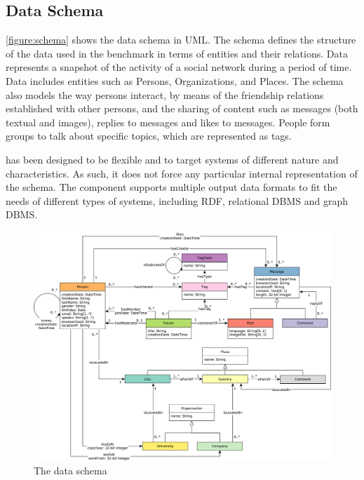 \subsection{Data Schema}

\autoref{figure:schema} shows the data schema in UML. The schema defines the
structure of the data used in the benchmark in terms of entities and their
relations. Data represents a snapshot of the activity of a social network
during a period of time. Data includes entities such as Persons, Organizations,
and Places. The schema also models the way persons interact, by means of the
friendship relations established with other persons, and the sharing of content
such as messages (both textual and images), replies to messages and likes to
messages.  People form groups to talk about specific topics, which are
represented as tags.

\ldbcsnb has been designed to be flexible and to target systems of different
nature and characteristics. As such, it does not force any particular internal
representation of the schema. The \datagen component
supports multiple output data formats to
fit the needs of different types of systems, including RDF, relational DBMS and
graph DBMS.


\begin{figure}[htbp]
	\centering
	\includegraphics[width=\linewidth]{figures/schema}
	\caption{The \ldbcsnb data schema}
	\label{figure:schema}
\end{figure}

